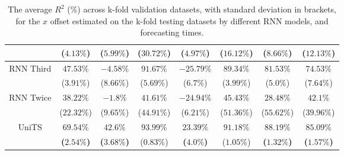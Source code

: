 \begin{table}[!ht]
{\begin{tabular}{|c|c|c|c|c|c|c|c|}
			 & ($4.13\%$) & ($5.99\%$) & ($30.72\%$) & ($4.97\%$) & ($16.12\%$) & ($8.66\%$) & ($12.13\%$) \\ \hline
			\multirow{2}{*}{RNN Third} & $47.53\%$ & $-4.58\%$ & $91.67\%$ & $-25.79\%$ & $89.34\%$ & $81.53\%$ & $74.53\%$ \\
			 & ($3.91\%$) & ($8.66\%$) & ($5.69\%$) & ($6.7\%$) & ($3.99\%$) & ($5.0\%$) & ($7.64\%$) \\ \hline
			\multirow{2}{*}{RNN Twice} & $38.22\%$ & $-1.8\%$ & $41.61\%$ & $-24.94\%$ & $45.43\%$ & $28.48\%$ & $42.1\%$ \\
			 & ($22.32\%$) & ($9.65\%$) & ($44.91\%$) & ($6.21\%$) & ($51.36\%$) & ($55.62\%$) & ($39.96\%$) \\ \hline
			\multirow{2}{*}{UniTS} & $\mathbf{69.54\%}$ & $\mathbf{42.6\%}$ & $93.99\%$ & $\mathbf{23.39\%}$ & $91.18\%$ & $\mathbf{88.19\%}$ & $\mathbf{85.09\%}$ \\
			 & \textbf{(}$\mathbf{2.54\%}$\textbf{)} & \textbf{(}$\mathbf{3.68\%}$\textbf{)} & ($0.83\%$) & \textbf{(}$\mathbf{4.0\%}$\textbf{)} & ($1.05\%$) & \textbf{(}$\mathbf{1.32\%}$\textbf{)} & \textbf{(}$\mathbf{1.57\%}$\textbf{)} \\ \hline
		\end{tabular}
	}
	\caption{The average $R^{2}$ (\%) across k-fold validation datasets, with standard deviation in brackets, for the $x$ offset estimated on the k-fold testing datasets by different RNN models, and forecasting times.}
	\label{tab:all_longitude_no_abs_R2}
\end{table}


